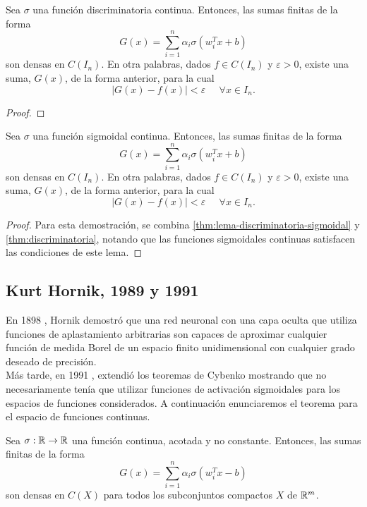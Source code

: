 \begin{teorema}\label{thm:discriminatoria}
Sea $\sigma$ una función discriminatoria continua. Entonces, las sumas finitas de la forma $$G(x)=\sum_{i=1}^n \alpha_i \sigma(w_i^Tx+b)$$ son densas en $C(I_n)$. En otra palabras, dados $f\in C(I_n)$ y $\varepsilon>0$, existe una suma, $G(x)$, de la forma anterior, para la cual $$|G(x)-f(x)|<\varepsilon \;\;\;\;\; \forall x \in I_n.$$
\end{teorema}
\begin{proof}
\end{proof}
\begin{teorema}\label{thm:sigmoidal}
Sea $\sigma$ una función sigmoidal continua. Entonces, las sumas finitas de la forma $$G(x)=\sum_{i=1}^n \alpha_i \sigma(w_i^Tx+b)$$ son densas en $C(I_n)$. En otra palabras, dados $f\in C(I_n)$ y $\varepsilon>0$, existe una suma, $G(x)$, de la forma anterior, para la cual $$|G(x)-f(x)|<\varepsilon \;\;\;\;\; \forall x \in I_n.$$
\end{teorema}
\begin{proof}
Para esta demostración, se combina \autoref{thm:lema-discriminatoria-sigmoidal} y \autoref{thm:discriminatoria}, notando que las funciones sigmoidales continuas satisfacen las condiciones de este lema.
\end{proof}

\subsection{Kurt Hornik, 1989 y 1991}

En 1898 \cite{HornikEtAl89}, Hornik demostró que una red neuronal con una capa oculta que utiliza funciones de aplastamiento arbitrarias son capaces de aproximar cualquier función de medida Borel de un espacio finito unidimensional con cualquier grado deseado de precisión.\\

Más tarde, en 1991 \cite{Kurt1991251}, extendió los teoremas de Cybenko mostrando que no necesariamente tenía que utilizar funciones de activación sigmoidales para los espacios de funciones considerados. A continuación enunciaremos el teorema para el espacio de funciones continuas.\\

\begin{teorema}
Sea $\sigma: \mathbb{R} \to \mathbb{R}$ una función continua, acotada y no constante. Entonces, las sumas finitas de la forma $$G(x)=\sum_{i=1}^n \alpha_i \sigma(w_i^Tx-b)$$ son densas en $C(X)$ para todos los subconjuntos compactos $X$ de $\mathbb{R}^m$.
\end{teorema}


